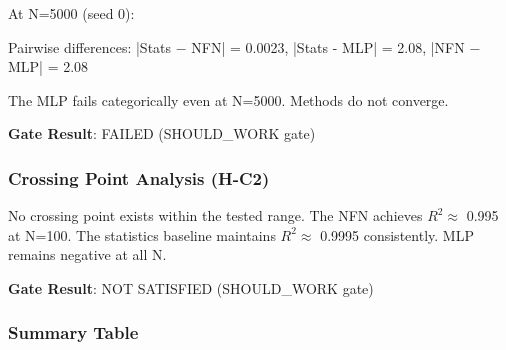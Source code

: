 At N=5000 (seed 0):

\begin{table}[htbp]
\centering
{}
\end{table}

Pairwise differences: |Stats $-$ NFN| = 0.0023, |Stats - MLP| = 2.08, |NFN $-$ MLP| = 2.08

The MLP fails categorically even at N=5000. Methods do not converge.

\textbf{Gate Result}: FAILED (SHOULD\_WORK gate)

\subsubsection{Crossing Point Analysis (H-C2)}

No crossing point exists within the tested range. The NFN achieves $R^2 \approx$ 0.995 at N=100. The statistics baseline maintains $R^2 \approx$ 0.9995 consistently. MLP remains negative at all N.

\textbf{Gate Result}: NOT SATISFIED (SHOULD\_WORK gate)

\subsubsection{Summary Table}

\begin{table}[htbp]
\centering
{}
\end{table}
